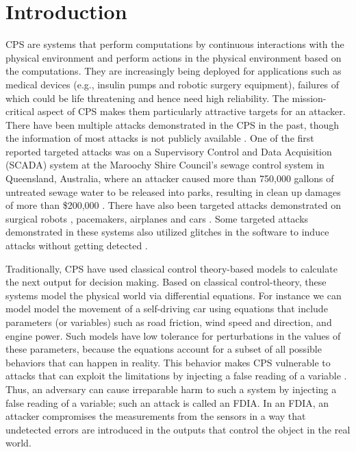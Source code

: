 
\chapter{Introduction }
\label{ch:Chapter1}
\ac{CPS} are systems that perform computations by continuous interactions with the physical environment and perform actions in the physical environment based on the computations.   
They are increasingly being deployed for applications \cite{10.1145/2038642.2038685}\cite{10.1145/1837274.1837463}\cite{6051465} such as medical devices (e.g., insulin pumps and robotic surgery equipment), failures of which could be life threatening and hence need high reliability. 
The mission-critical aspect of \ac{CPS} makes them particularly attractive targets for an attacker. 
There have been multiple attacks demonstrated in the \ac{CPS} in the past, though the information of most attacks is not publicly available \cite{doi:10.1080/13518040590969785}.
One of the first reported targeted attacks was on a Supervisory Control and Data Acquisition (SCADA) system \cite{article22} at the Maroochy Shire Council’s sewage control system in Queensland, Australia, where an attacker caused more than 750,000 gallons of untreated sewage water to be released into parks, resulting in clean up damages of more than \$200,000 \cite{10.1016/j.adhoc.2009.04.012}.
There have also been targeted attacks demonstrated on surgical robots \cite{7579758}, pacemakers\cite{4531149}, airplanes \cite{217595} and  cars \cite{10.5555/1929820.1929848}.
Some targeted attacks demonstrated in these systems also utilized glitches in the software to induce attacks without getting detected \cite{242054}. 



Traditionally, \ac{CPS} have used classical control theory-based models \cite{6051465} \cite{1337806} \cite{10.1145/2038642.2038667}  to calculate the next output for decision making. 
Based on classical control-theory, these systems model the physical world via differential equations. 
For instance we can model model the movement of a self-driving car using equations that include parameters (or variables) such as road friction, wind speed and direction, and engine power. 
Such models have low tolerance for perturbations in the values of these parameters, because the equations account for a subset of all possible behaviors that can happen in reality. 
This behavior makes \ac{CPS} vulnerable to attacks that can exploit the limitations by injecting a false reading of a variable \cite{10.1145/1952982.1952995}. 
Thus, an adversary can cause irreparable harm to such a system by injecting a false reading of a variable; such an attack is called an \ac{FDIA}.
 In an \ac{FDIA}, an attacker compromises the measurements from the sensors in a way that undetected errors are introduced in the outputs \cite{7438916} that control the object in the real world. 
 


